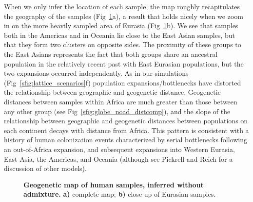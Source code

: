 \documentclass[10pt,letterpaper]{article}
\begin{document}
When we only infer the location of each sample, the map roughly recapitulates the geography of the samples (Fig\ \ref{sfig:globe_noad_maps}a), a result that holds nicely when we zoom in on the more heavily sampled area of Eurasia (Fig\ \ref{sfig:globe_noad_maps}b). We see that samples both in the Americas and in Oceania lie close to the East Asian samples, but that they form two clusters on opposite sides.  The proximity of these groups to the East Asians represents the fact that both groups share an ancestral population in the relatively recent past with East Eurasian populations, but the two expansions occurred independently. As in our simulations (Fig\ \ref{sfig:lattice_scenarios}f) population expansions/bottlenecks have distorted the relationship between geographic and geogenetic distance. 
Geogenetic distances between samples within Africa are much greater than those between any other group (see Fig\ \ref{sfig:globe_noad_distcomp}), 
and the slope of the relationship between geographic and geogenetic distances between populations on each continent decays with distance from Africa.  
This pattern is consistent with a history of human colonization events characterized by serial bottlenecks \cite{Harpending_Rogers_2000,prugnolle_geography_2005,Ramachandran:05} following an out-of-Africa expansion, and subsequent expansions into Western Eurasia, East Asia, the Americas, and Oceania (although see Pickrell and Reich \cite{pickrell_reich:14} for a discussion of other models). 
%
\begin{figure}[ht!]
\begin{center}
\end{center}
\caption{
\textbf{Geogenetic map of human samples, inferred without admixture.}
	\textbf{a)} complete map; 
	\textbf{b)} close-up of Eurasian samples.
}\label{sfig:globe_noad_maps}
\end{figure}
\end{document}
